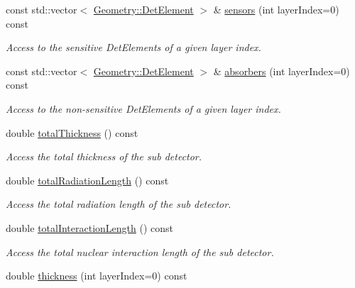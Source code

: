 \begin{DoxyCompactItemize}
const std::vector$<$ \hyperlink{class_d_d4hep_1_1_geometry_1_1_det_element}{Geometry::DetElement} $>$ \& \hyperlink{class_d_d4hep_1_1_d_d_rec_1_1_layered_subdetector_aaa4246ef49e83aa4ab6ec6f2177ddf1c}{sensors} (int layerIndex=0) const 
\begin{DoxyCompactList}\small\item\em Access to the sensitive DetElements of a given layer index. \item\end{DoxyCompactList}\item 
const std::vector$<$ \hyperlink{class_d_d4hep_1_1_geometry_1_1_det_element}{Geometry::DetElement} $>$ \& \hyperlink{class_d_d4hep_1_1_d_d_rec_1_1_layered_subdetector_a5359b752b8f6105c65fbe3e65044fdcb}{absorbers} (int layerIndex=0) const 
\begin{DoxyCompactList}\small\item\em Access to the non-\/sensitive DetElements of a given layer index. \item\end{DoxyCompactList}\item 
double \hyperlink{class_d_d4hep_1_1_d_d_rec_1_1_layered_subdetector_a3bfdb0cc2f8b907fe8fb505b778db042}{totalThickness} () const 
\begin{DoxyCompactList}\small\item\em Access the total thickness of the sub detector. \item\end{DoxyCompactList}\item 
double \hyperlink{class_d_d4hep_1_1_d_d_rec_1_1_layered_subdetector_ae33ee0ed3dc3c41b7449e950176d37c2}{totalRadiationLength} () const 
\begin{DoxyCompactList}\small\item\em Access the total radiation length of the sub detector. \item\end{DoxyCompactList}\item 
double \hyperlink{class_d_d4hep_1_1_d_d_rec_1_1_layered_subdetector_a632134e4968e37fad507321af6c87cb9}{totalInteractionLength} () const 
\begin{DoxyCompactList}\small\item\em Access the total nuclear interaction length of the sub detector. \item\end{DoxyCompactList}\item 
double \hyperlink{class_d_d4hep_1_1_d_d_rec_1_1_layered_subdetector_ad17611716c4b7318db220afb0f93e123}{thickness} (int layerIndex=0) const 

\end{DoxyCompactItemize}
